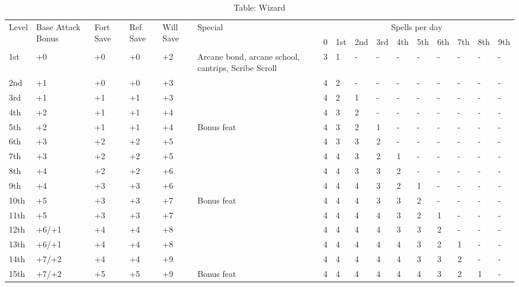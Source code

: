 \begin{table}[]
\caption{Table: Wizard}
\sffamily
\setlength{\tabcolsep}{1pt}
\begin{tabularx}{\linewidth}{lp{6em}p{2.5em}p{2.5em}p{2.5em}Xllllllllll}
\multirow{2}{*}{Level} & \multirow{2}{*}{\parbox{5em}{Base Attack Bonus}} & \multirow{2}{*}{\parbox{1.5em}{Fort Save}} & \multirow{2}{*}{\parbox{1.5em}{Ref Save}} & \multirow{2}{*}{\parbox{1.5em}{Will Save}} & Special                                                                                              & \multicolumn{10}{c}{Spells per day} \\
                       &                                    &                            &                           &                            &                                                                                                  &  0 & 1st & 2nd & 3rd & 4th & 5th & 6th & 7th & 8th & 9th \\
\hline
1st & +0 & +0 & +0 & +2 & Arcane bond, arcane school, cantrips, Scribe Scroll & 3 & 1 & - & - & - & - & - & - & - & -\\
2nd & +1 & +0 & +0 & +3 &  & 4 & 2 & - & - & - & - & - & - & - & -\\
3rd & +1 & +1 & +1 & +3 &  & 4 & 2 & 1 & - & - & - & - & - & - & -\\
4th & +2 & +1 & +1 & +4 &  & 4 & 3 & 2 & - & - & - & - & - & - & -\\
5th & +2 & +1 & +1 & +4 & Bonus feat & 4 & 3 & 2 & 1 & - & - & - & - & - & -\\
6th & +3 & +2 & +2 & +5 &  & 4 & 3 & 3 & 2 & - & - & - & - & - & -\\
7th & +3 & +2 & +2 & +5 &  & 4 & 4 & 3 & 2 & 1 & - & - & - & - & -\\
8th & +4 & +2 & +2 & +6 &  & 4 & 4 & 3 & 3 & 2 & - & - & - & - & -\\
9th & +4 & +3 & +3 & +6 &  & 4 & 4 & 4 & 3 & 2 & 1 & - & - & - & -\\
10th & +5 & +3 & +3 & +7 & Bonus feat & 4 & 4 & 4 & 3 & 3 & 2 & - & - & - & -\\
11th & +5 & +3 & +3 & +7 &  & 4 & 4 & 4 & 4 & 3 & 2 & 1 & - & - & -\\
12th & +6/+1 & +4 & +4 & +8 &  & 4 & 4 & 4 & 4 & 3 & 3 & 2 & - & - & -\\
13th & +6/+1 & +4 & +4 & +8 &  & 4 & 4 & 4 & 4 & 4 & 3 & 2 & 1 & - & -\\
14th & +7/+2 & +4 & +4 & +9 &  & 4 & 4 & 4 & 4 & 4 & 3 & 3 & 2 & - & -\\
15th & +7/+2 & +5 & +5 & +9 & Bonus feat & 4 & 4 & 4 & 4 & 4 & 4 & 3 & 2 & 1 & -\\

\end{tabularx}
\end{table}
